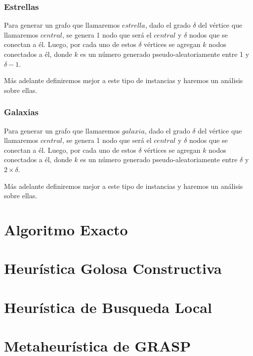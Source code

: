 \documentclass[a4paper]{article}
\begin{document}
\subsubsection{Estrellas}

Para generar un grafo que llamaremos $estrella$, dado el grado $\delta$ del vértice que llamaremos $central$, se genera 1 nodo que será el $central$ y $\delta$ nodos que se conectan a él. Luego, por cada uno de estos $\delta$ vértices se agregan $k$ nodos conectados a él, donde $k$ es un número generado pseudo-aleatoriamente entre 1 y $\delta - 1$.

Más adelante definiremos mejor a este tipo de instancias y haremos un análisis sobre ellas.

\subsubsection{Galaxias}

Para generar un grafo que llamaremos $galaxia$, dado el grado $\delta$ del vértice que llamaremos $central$, se genera 1 nodo que será el $central$ y $\delta$ nodos que se conectan a él. Luego, por cada uno de estos $\delta$ vértices se agregan $k$ nodos conectados a él, donde $k$ es un número generado pseudo-aleatoriamente entre $\delta$ y $2 \times \delta$.

Más adelante definiremos mejor a este tipo de instancias y haremos un análisis sobre ellas.


\vspace*{0.6cm}

\section{Algoritmo Exacto}
\vspace*{0.3cm}


\vspace*{0.6cm}
\section{Heurística Golosa Constructiva}
\vspace*{0.3cm}


\newpage
\section{Heurística de Busqueda Local}


\newpage
\section{Metaheurística de GRASP}

\end{document}

